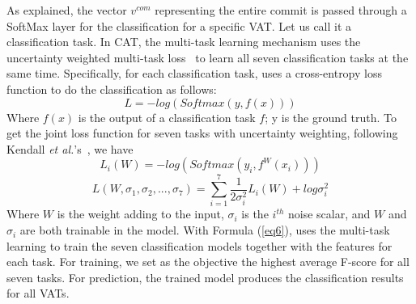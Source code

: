 

As explained, the vector $v^{com}$
representing the entire commit is passed through a SoftMax layer for
the classification for a specific VAT. Let us call it a classification
task. In CAT, the multi-task learning mechanism uses the uncertainty
weighted multi-task loss~\cite{kendall2018multi} to learn all seven
classification tasks at the same time. Specifically, for each
classification task, \tool uses a cross-entropy loss function to do
the classification as follows:
\begin{equation}\label{eq4}
	L = -log(Softmax(y, f(x)))
\end{equation}
Where $f(x)$ is the output of a classification task $f$; y is the
ground truth. To get the joint loss function for seven tasks with
uncertainty weighting, following Kendall {\em et
  al.}'s~\cite{kendall2018multi}, we have
\begin{equation}\label{eq5}
	L_i(W) = -log(Softmax(y_i, f^W(x_i)))
\end{equation}
\begin{equation}\label{eq6}
	L(W, \sigma_1, \sigma_2, ..., \sigma_7) = \sum_{i=1}^7\frac{1}{2\sigma_i^2}L_i(W) + log \sigma^2_i
\end{equation}
Where $W$ is the weight adding to the input, $\sigma_i$ is the
$i^{th}$ noise scalar, and $W$ and $\sigma_i$ are both trainable in
the model. With Formula (\ref{eq6}), {\tool} uses the multi-task
learning to train the seven classification models together with the
features for each task. For training, we set as the objective the
highest average F-score  for all seven
tasks. For prediction, the trained model produces the
classification results for all VATs.
